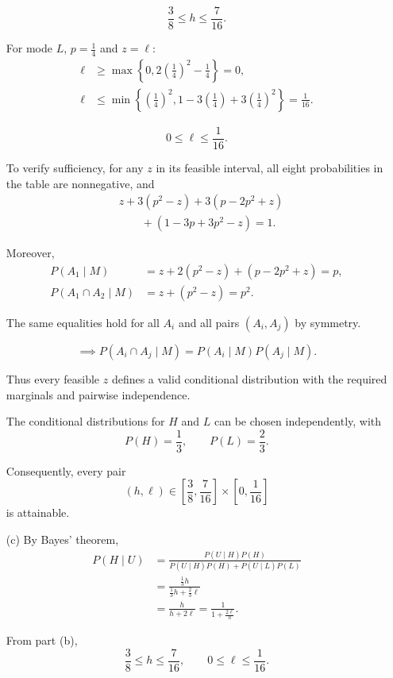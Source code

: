 \documentclass[11pt,a4paper]{article}
\newcommand{\Prob}{P}
\begin{document}
\begin{enumerate}
\[
\frac38\le h\le\frac7{16}.
\]

For mode $L$, $p=\frac14$ and $z=\ell$:
\[
\begin{aligned}
\ell&\ge\max\left\{
0,2\left(\frac14\right)^2-\frac14
\right\}=0,\\
\ell&\le\min\left\{
\left(\frac14\right)^2,
1-3\left(\frac14\right)
+3\left(\frac14\right)^2
\right\}=\frac1{16}.
\end{aligned}
\]

\[
0\le\ell\le\frac1{16}.
\]

To verify sufficiency, for any $z$ in its feasible
interval, all eight probabilities in the table
are nonnegative, and
\[
\begin{aligned}
&z+3(p^2-z)+3(p-2p^2+z)\\
&\qquad +(1-3p+3p^2-z)=1.
\end{aligned}
\]

Moreover,
\[
\begin{aligned}
\Prob(A_1\mid M)
&=z+2(p^2-z)+(p-2p^2+z)=p,\\
\Prob(A_1\cap A_2\mid M)
&=z+(p^2-z)=p^2.
\end{aligned}
\]

The same equalities hold for all $A_i$ and
all pairs $(A_i,A_j)$ by symmetry.

\[
\implies
\Prob(A_i\cap A_j\mid M)
=\Prob(A_i\mid M)\Prob(A_j\mid M).
\]

Thus every feasible $z$ defines a valid
conditional distribution with the required
marginals and pairwise independence.

The conditional distributions for $H$ and $L$
can be chosen independently, with
\[
\Prob(H)=\frac13,\qquad
\Prob(L)=\frac23.
\]

Consequently, every pair
\[
(h,\ell)\in
\left[\frac38,\frac7{16}\right]
\times\left[0,\frac1{16}\right]
\]
is attainable.

\item[(c)]
By Bayes' theorem,
\[
\begin{aligned}
\Prob(H\mid U)
&=\frac{\Prob(U\mid H)\Prob(H)}
{\Prob(U\mid H)\Prob(H)+\Prob(U\mid L)\Prob(L)}\\
&=\frac{\frac13h}{\frac13h+\frac23\ell}\\
&=\frac{h}{h+2\ell}
=\frac1{1+\frac{2\ell}{h}}.
\end{aligned}
\]

From part (b),
\[
\frac38\le h\le\frac7{16},
\qquad
0\le\ell\le\frac1{16}.
\]


\end{enumerate}
\end{document}
